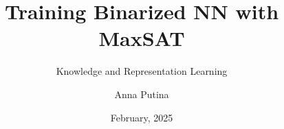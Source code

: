 
\title[Binarized NN MaxSAT]{Training Binarized NN with MaxSAT}
\subtitle{Knowledge and Representation Learning}
\author[Anna Putina]{Anna Putina}


\date[February, 2025] 
{February, 2025}




